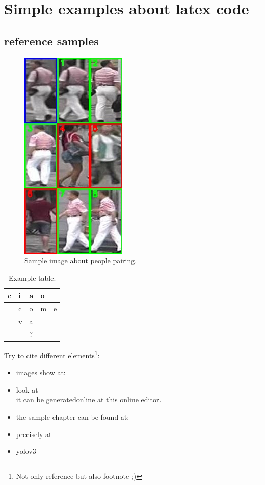 \chapter{Simple examples about latex code}
\label{cha:samples}

\section{reference samples}
\label{sec:refSamples}

\begin{figure}[!h]
	\centering
	\includegraphics[]{images/peoplePairing.jpg}
	\caption{Sample image about people pairing.}
	\label{fig:peoplePair}
\end{figure}

\begin{table}[h]
	\centering
	\begin{tabular}{ll|l|ll}
		\cline{1-4}
		\multicolumn{1}{|l|}{c} & i & a & \multicolumn{1}{l|}{o} &                        \\ \hline
		\multicolumn{1}{l|}{}   & c & o & \multicolumn{1}{l|}{m} & \multicolumn{1}{l|}{e} \\ \cline{2-5} 
		\multicolumn{1}{l|}{}   & v & a &                        &                        \\ \cline{2-3}
		&   & ? &                        &                        \\ \cline{3-3}
	\end{tabular}
	\caption{Example table.}
	\label{tab:sampleTable}
\end{table}

Try to cite different elements\footnote{Not only reference but also footnote ;)}:
\begin{itemize}
	\item images show at: 
	\item look at \\
	it can be generatedonline at this \href{https://www.tablesgenerator.com/}{online editor}.
	\item the sample chapter can be found at: 
	\item precisely at 
	\item yolov3 \cite{yolov3}
\end{itemize}

